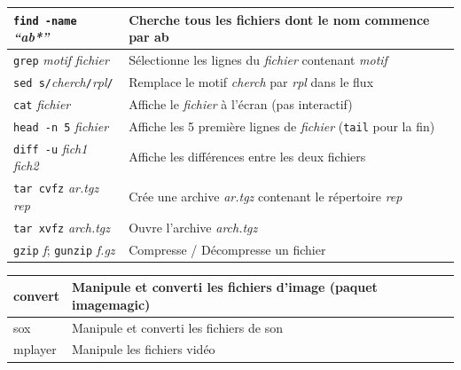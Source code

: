 \documentclass[a4paper,10pt,landscape,twocolumn]{article}
\newcommand{\Subsection}[1]{{\textbf{#1}}}
\begin{document}
\begin{tabular}{|p{3cm}|p{10cm}|}\hline
\texttt{find -name} \textit{``ab*''} & Cherche tous les fichiers dont le nom commence par ab \\\hline

\texttt{grep} \textit{motif} \textit{fichier}& Sélectionne les lignes du \textit{fichier}
contenant \textit{motif}\\\hline

  \texttt{sed s/}\textit{cherch}\texttt{/}\textit{rpl}\texttt{/}&
  Remplace le motif \textit{cherch} par \textit{rpl} dans le flux\\\hline 
\texttt{cat} \textit{fichier}& Affiche le \textit{fichier} à l'écran (pas interactif)\\ \hline

  \texttt{head -n 5} \textit{fichier}&
   Affiche les 5 première lignes de \textit{fichier} (\texttt{tail} pour la fin) \\\hline

\texttt{diff -u} \textit{fich1} \textit{fich2}& Affiche les différences entre les deux fichiers\\\hline

{\small \texttt{tar cvfz} \textit{ar.tgz} \textit{rep}} & Crée une archive \textit{ar.tgz}
contenant le répertoire \textit{rep}\\
\texttt{tar xvfz} \textit{arch.tgz} & Ouvre l'archive \textit{arch.tgz}\\\hline

\texttt{gzip} \textit{f}; \texttt{gunzip} \textit{f.gz} & Compresse / Décompresse un fichier\\\hline
\end{tabular}

\medskip\Subsection{Convertions}\smallskip

\begin{tabular}{|p{30mm}|p{100mm}|}\hline
convert & Manipule et converti les fichiers d'image (paquet imagemagic)\\\hline
sox & Manipule et converti les fichiers de son\\\hline
mplayer & Manipule les fichiers vidéo\\\hline
\end{tabular}
\end{document}
